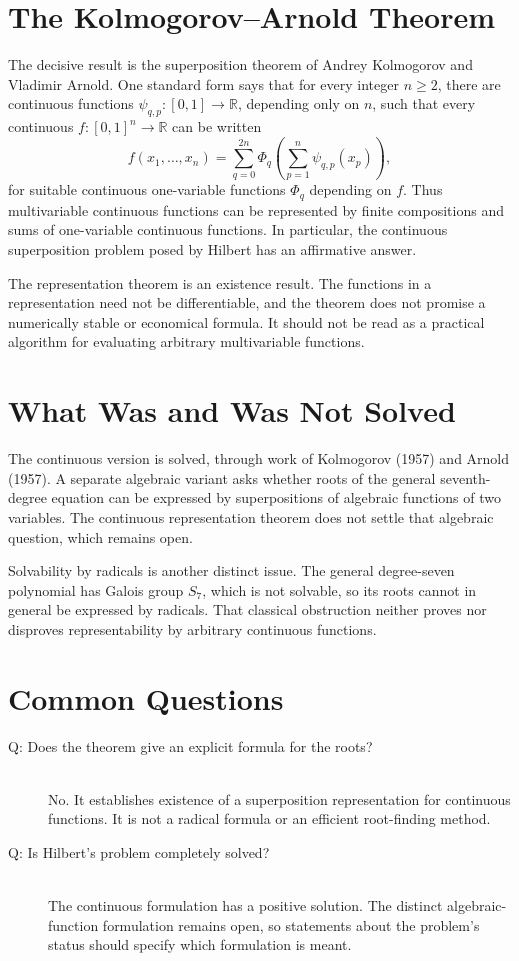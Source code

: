 \section{The Kolmogorov--Arnold Theorem}

The decisive result is the superposition theorem of Andrey Kolmogorov and Vladimir Arnold. One standard form says that for every integer $n\geq 2$, there are continuous functions $\psi_{q,p}:[0,1]\to\mathbb{R}$, depending only on $n$, such that every continuous $f:[0,1]^n\to\mathbb{R}$ can be written
\[
 f(x_1,\ldots,x_n)=\sum_{q=0}^{2n}\Phi_q\!\left(\sum_{p=1}^{n}\psi_{q,p}(x_p)\right),
\]
for suitable continuous one-variable functions $\Phi_q$ depending on $f$. Thus multivariable continuous functions can be represented by finite compositions and sums of one-variable continuous functions. In particular, the continuous superposition problem posed by Hilbert has an affirmative answer.

The representation theorem is an existence result. The functions in a representation need not be differentiable, and the theorem does not promise a numerically stable or economical formula. It should not be read as a practical algorithm for evaluating arbitrary multivariable functions.

\section{What Was and Was Not Solved}

The continuous version is solved, through work of Kolmogorov (1957) and Arnold (1957). A separate algebraic variant asks whether roots of the general seventh-degree equation can be expressed by superpositions of algebraic functions of two variables. The continuous representation theorem does not settle that algebraic question, which remains open.

Solvability by radicals is another distinct issue. The general degree-seven polynomial has Galois group $S_7$, which is not solvable, so its roots cannot in general be expressed by radicals. That classical obstruction neither proves nor disproves representability by arbitrary continuous functions.

\section{Common Questions}

\begin{description}
\item[Q: Does the theorem give an explicit formula for the roots?]\hfill\\
No. It establishes existence of a superposition representation for continuous functions. It is not a radical formula or an efficient root-finding method.

\item[Q: Is Hilbert's problem completely solved?]\hfill\\
The continuous formulation has a positive solution. The distinct algebraic-function formulation remains open, so statements about the problem's status should specify which formulation is meant.
\end{description}

